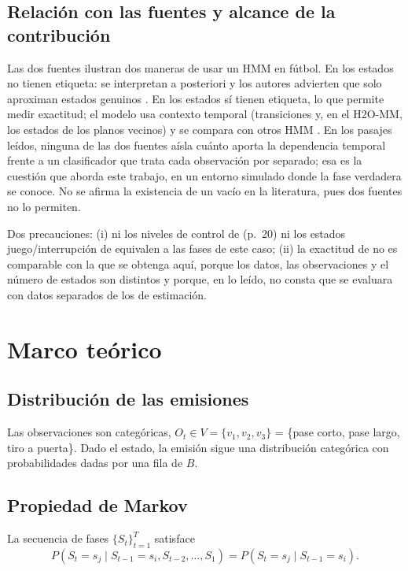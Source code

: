 \documentclass[11pt,a4paper]{article}
\begin{document}
\subsection{Relación con las fuentes y alcance de la contribución}

Las dos fuentes ilustran dos maneras de usar un HMM en fútbol. En
\cite{otting2023} los estados no tienen etiqueta: se interpretan a posteriori y
los autores advierten que solo aproximan estados genuinos
\cite[p.~23]{otting2023}. En \cite{fani2017} los estados sí tienen etiqueta, lo
que permite medir exactitud; el modelo usa contexto temporal (transiciones y,
en el H2O-MM, los estados de los planos vecinos) y se compara con otros HMM
\cite[pp.~27329--27333]{fani2017}. En los pasajes leídos, ninguna de las dos
fuentes aísla cuánto aporta la dependencia temporal frente a un clasificador
que trata cada observación por separado; esa es la cuestión que aborda este
trabajo, en un entorno simulado donde la fase verdadera se conoce. No se
afirma la existencia de un vacío en la literatura, pues dos fuentes no lo
permiten.

Dos precauciones: (i) ni los niveles de control de \cite{otting2023} (p.~20)
ni los estados juego/interrupción de \cite{fani2017} equivalen a las fases de
este caso; (ii) la exactitud de \cite{fani2017} no es comparable con la que se
obtenga aquí, porque los datos, las observaciones y el número de estados son
distintos y porque, en lo leído, no consta que se evaluara con datos separados
de los de estimación.

\section{Marco teórico}

\subsection{Distribución de las emisiones}
Las observaciones son categóricas, $O_t\in V=\{v_1,v_2,v_3\}$ = \{pase corto,
pase largo, tiro a puerta\}. Dado el estado, la emisión sigue una distribución
categórica con probabilidades dadas por una fila de $B$.

\subsection{Propiedad de Markov}
La secuencia de fases $\{S_t\}_{t=1}^{T}$ satisface
\begin{equation}
P(S_t=s_j\mid S_{t-1}=s_i,S_{t-2},\dots,S_1)=P(S_t=s_j\mid S_{t-1}=s_i).
\end{equation}
\end{document}
